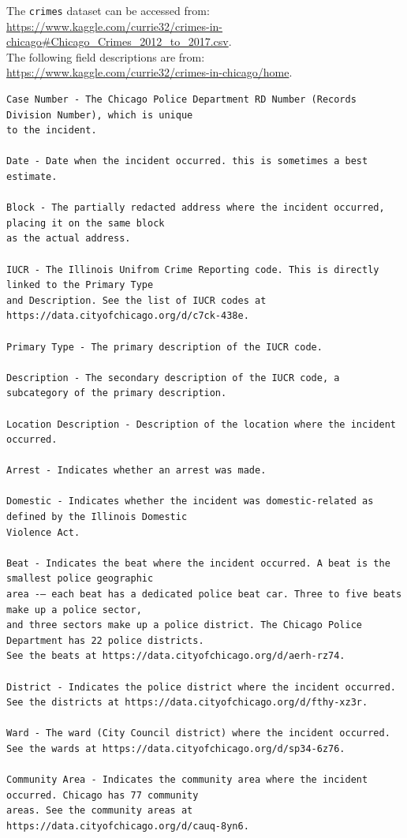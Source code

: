 \documentclass[11pt]{article}
\newcommand{\1}{\mathds{1}}
\def\code#1{\texttt{#1}}
\begin{document}
The \code{crimes} dataset can be accessed from: \\
\href{https://www.kaggle.com/currie32/crimes-in-chicago#Chicago_Crimes_2012_to_2017.csv}{https://www.kaggle.com/currie32/crimes-in-chicago\#Chicago\_Crimes\_2012\_to\_2017.csv}. \\
The following field descriptions are from: \\
\href{url}{https://www.kaggle.com/currie32/crimes-in-chicago/home}. 

\begin{Verbatim}[fontsize=\small]
Case Number - The Chicago Police Department RD Number (Records Division Number), which is unique 
to the incident.

Date - Date when the incident occurred. this is sometimes a best estimate.

Block - The partially redacted address where the incident occurred, placing it on the same block 
as the actual address.

IUCR - The Illinois Unifrom Crime Reporting code. This is directly linked to the Primary Type 
and Description. See the list of IUCR codes at https://data.cityofchicago.org/d/c7ck-438e.

Primary Type - The primary description of the IUCR code.

Description - The secondary description of the IUCR code, a subcategory of the primary description.

Location Description - Description of the location where the incident occurred.

Arrest - Indicates whether an arrest was made.

Domestic - Indicates whether the incident was domestic-related as defined by the Illinois Domestic 
Violence Act.

Beat - Indicates the beat where the incident occurred. A beat is the smallest police geographic 
area -– each beat has a dedicated police beat car. Three to five beats make up a police sector, 
and three sectors make up a police district. The Chicago Police Department has 22 police districts. 
See the beats at https://data.cityofchicago.org/d/aerh-rz74.

District - Indicates the police district where the incident occurred. 
See the districts at https://data.cityofchicago.org/d/fthy-xz3r.

Ward - The ward (City Council district) where the incident occurred. 
See the wards at https://data.cityofchicago.org/d/sp34-6z76.

Community Area - Indicates the community area where the incident occurred. Chicago has 77 community 
areas. See the community areas at https://data.cityofchicago.org/d/cauq-8yn6.


\end{Verbatim}
\end{document}
